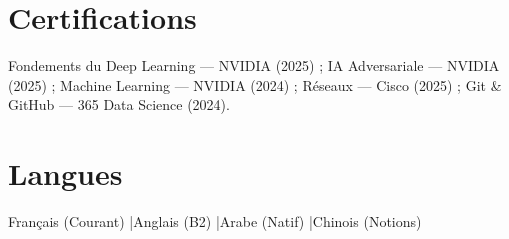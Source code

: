 \documentclass[a4paper,9pt]{article}
\begin{document}
\section{Certifications}
Fondements du Deep Learning --- NVIDIA (2025) ; IA Adversariale --- NVIDIA (2025) ; Machine Learning --- NVIDIA (2024) ; Réseaux --- Cisco (2025) ; Git \& GitHub --- 365 Data Science (2024).
\section{Langues}
Français (Courant) \quad|\quad Anglais (B2) \quad|\quad Arabe (Natif) \quad|\quad Chinois (Notions)
\end{document}
